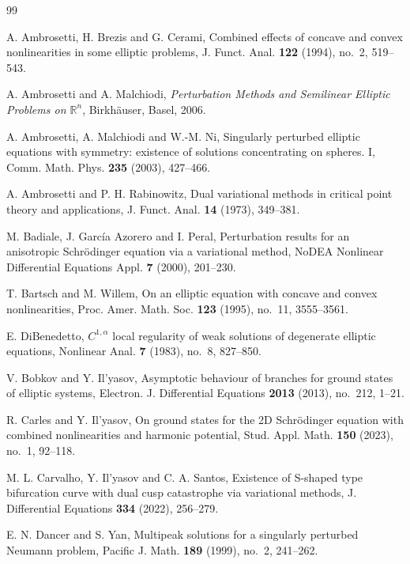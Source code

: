 \documentclass[preprint,11pt]{elsarticle}
\numberwithin{equation}{section}
\begin{document}

% 
\begin{thebibliography}{99}
	
	A. Ambrosetti, H. Brezis and G. Cerami,
	Combined effects of concave and convex nonlinearities in some elliptic problems,
	J. Funct. Anal. \textbf{122} (1994), no.~2, 519--543.
	
	A. Ambrosetti and A. Malchiodi,
	\textit{Perturbation Methods and Semilinear Elliptic Problems on \(\mathbb R^n\)},
	Birkh\"auser, Basel, 2006.
	
	A. Ambrosetti, A. Malchiodi and W.-M. Ni,
	Singularly perturbed elliptic equations with symmetry: existence of solutions
	concentrating on spheres. I,
	Comm. Math. Phys. \textbf{235} (2003), 427--466.
	
	A. Ambrosetti and P. H. Rabinowitz,
	Dual variational methods in critical point theory and applications,
	J. Funct. Anal. \textbf{14} (1973), 349--381.
	
	M. Badiale, J. Garc\'ia Azorero and I. Peral,
	Perturbation results for an anisotropic Schr\"odinger equation via a
	variational method,
	NoDEA Nonlinear Differential Equations Appl. \textbf{7} (2000), 201--230.
	
	T. Bartsch and M. Willem,
	On an elliptic equation with concave and convex nonlinearities,
	Proc. Amer. Math. Soc. \textbf{123} (1995), no.~11, 3555--3561.
	
	E. DiBenedetto,
	\(C^{1,\alpha}\) local regularity of weak solutions of degenerate elliptic
	equations,
	Nonlinear Anal. \textbf{7} (1983), no.~8, 827--850.
	
	V. Bobkov and Y. Il'yasov,
	Asymptotic behaviour of branches for ground states of elliptic systems,
	Electron. J. Differential Equations \textbf{2013} (2013), no.~212, 1--21.
	
	R. Carles and Y. Il'yasov,
	On ground states for the 2D Schr\"odinger equation with combined nonlinearities
	and harmonic potential,
	Stud. Appl. Math. \textbf{150} (2023), no.~1, 92--118.
	
	M. L. Carvalho, Y. Il'yasov and C. A. Santos,
	Existence of S-shaped type bifurcation curve with dual cusp catastrophe via
	variational methods,
	J. Differential Equations \textbf{334} (2022), 256--279.
	
	E. N. Dancer and S. Yan,
	Multipeak solutions for a singularly perturbed Neumann problem,
	Pacific J. Math. \textbf{189} (1999), no.~2, 241--262.
	

\end{thebibliography}
\end{document}
